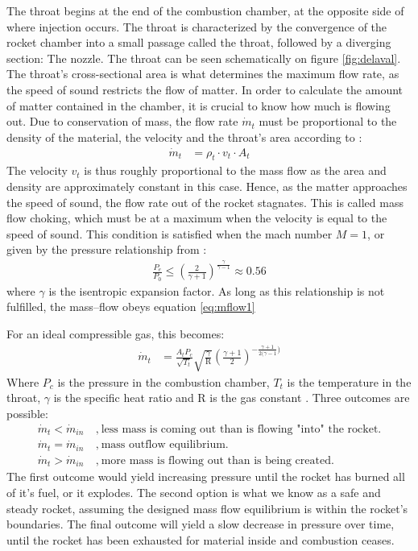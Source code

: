 	The throat begins at the end of the combustion chamber, at the opposite side of where injection occurs. The throat is characterized by the convergence of the rocket chamber into a small passage called the throat, followed by a diverging section: The nozzle. The throat can be seen schematically on figure \ref{fig:delaval}. The throat's cross-sectional area is what determines the maximum flow rate, as the speed of sound restricts the flow of matter. In order to calculate the amount of matter contained in the chamber, it is crucial to know how much is flowing out. Due to conservation of mass, the flow rate $\dot{m}_t$ must be proportional to the density of the material, the velocity and the throat's area according to \cite{nasacompflow}:
		\begin{align}\label{eq:mflow1}
			\dot{m}_t &= \rho_t \cdot v_t \cdot A_t
		\end{align}
		The velocity $v_t$ is thus roughly proportional to the mass flow as the area and density are approximately constant in this case. Hence, as the matter approaches the speed of sound, the flow rate out of the rocket stagnates. This is called mass flow choking, which must be at a maximum when the velocity is equal to the speed of sound. This condition is satisfied when the mach number $M=1$, or given by the pressure relationship from \cite{mechanicsoffluids}:
		\begin{align}
			\frac{P_e}{P_0} \leq \left(\frac{2}{\gamma+1}\right)^\frac{\gamma}{\gamma-1} \approx 0.56
		\end{align}
		where $\gamma$ is the isentropic expansion factor. As long as this relationship is not fulfilled, the mass--flow obeys equation \ref{eq:mflow1}

		For an ideal compressible gas, this becomes:
		\begin{align}
			\dot{m}_t &= \frac{A_t P_c}{\sqrt{T_t}} \sqrt{\frac{\gamma}{\text{R}}} \left(\frac{\gamma+1}{2}\right)^{-\frac{\gamma+1}{2(\gamma-1})}
		\end{align}
	Where $P_c$ is the pressure in the combustion chamber, $T_t$ is the temperature in the throat, $\gamma$ is the specific heat ratio and R is the gas constant \cite{nasacompflow}. Three outcomes are possible:
	\begin{align*}
		\dot{m}_t < \dot{m}_{in} & ~,~ \text{less mass is coming out than is flowing "into" the rocket.} \\
		\dot{m}_t = \dot{m}_{in} & ~,~ \text{mass outflow equilibrium.} \\
		\dot{m}_t > \dot{m}_{in} & ~,~ \text{more mass is flowing out than is being created.}
	\end{align*}
	The first outcome would yield increasing pressure until the rocket has burned all of it's fuel, or it explodes. The second option is what we know as a safe and steady rocket, assuming the designed mass flow equilibrium is within the rocket's boundaries. The final outcome will yield a slow decrease in pressure over time, until the rocket has been exhausted for material inside and combustion ceases. 

